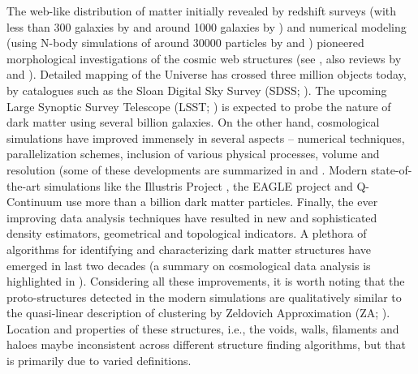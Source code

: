 The web-like distribution of matter initially revealed by redshift surveys (with less than 300 galaxies by \citealt{Gregory1978} and around 1000 galaxies by \citealt{Lapparent1986}) and numerical modeling (using N-body simulations of around 30000 particles by \citealt{Shandarin1983} and \citealt{Klypin1983a}) pioneered morphological investigations of the cosmic web structures (see \citealt{Bond1996}, also reviews by \citealt{Shandarin1989} and \citealt{Weygaert2008}). Detailed mapping of the Universe has crossed three million objects today, by catalogues such as the Sloan Digital Sky Survey (SDSS; \citealt{Albareti2016}). The upcoming Large Synoptic Survey Telescope (LSST; \citealt{lsst2009}) is expected to probe the nature of dark matter using several billion galaxies. On the other hand, cosmological simulations have improved immensely in several aspects -- numerical techniques, parallelization schemes, inclusion of various physical processes, volume and resolution (some of these developments are summarized in \cite{Bertschinger1998} and \cite{Bagla1997}. Modern state-of-the-art simulations like the Illustris Project \cite{Vogelsberger2014}, the EAGLE project \cite{Schaye2015} and Q-Continuum \cite{Heitmann2015} use more than a billion dark matter particles. Finally, the ever improving data analysis techniques have resulted in new and sophisticated density estimators, geometrical and topological indicators. A plethora of algorithms for identifying and characterizing dark matter structures have emerged in last two decades (a summary on cosmological data analysis is highlighted in \citealt{Weygaert2009a}). Considering all these improvements, it is worth noting that the proto-structures detected in the modern simulations are qualitatively similar to the quasi-linear description of clustering by Zeldovich Approximation (ZA; \citealt{Zeldovich1970}). Location and properties of these structures, i.e., the voids, walls, filaments and haloes maybe inconsistent across different structure finding algorithms, but that is primarily due to varied definitions. 


